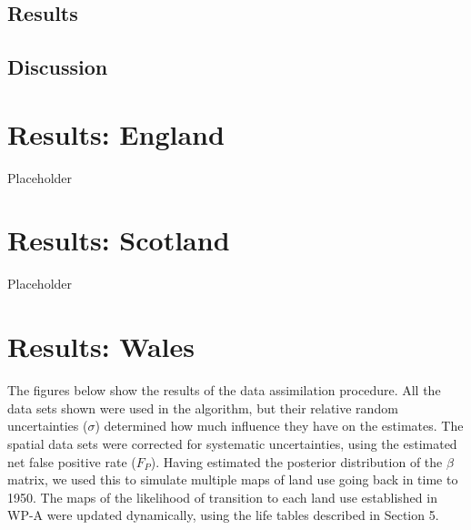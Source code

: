 \documentclass[
]{book}
\begin{document}
\hypertarget{results-4}{%
\section{Results}\label{results-4}}

\hypertarget{discussion-1}{%
\section{Discussion}\label{discussion-1}}

\hypertarget{results-england}{%
\chapter{Results: England}\label{results-england}}

Placeholder

\hypertarget{results-scotland}{%
\chapter{Results: Scotland}\label{results-scotland}}

Placeholder

\hypertarget{results-wales}{%
\chapter{Results: Wales}\label{results-wales}}

The figures below show the results of the data assimilation procedure. All the data sets shown were used in the algorithm, but their relative random uncertainties (\(\sigma\)) determined how much influence they have on the estimates. The spatial data sets were corrected for systematic uncertainties, using the estimated net false positive rate (\(F_P\)). Having estimated the posterior distribution of the \(\beta\) matrix, we used this to simulate multiple maps of land use going back in time to 1950. The maps of the likelihood of transition to each land use established in WP-A were updated dynamically, using the life tables described in Section 5.
\end{document}
